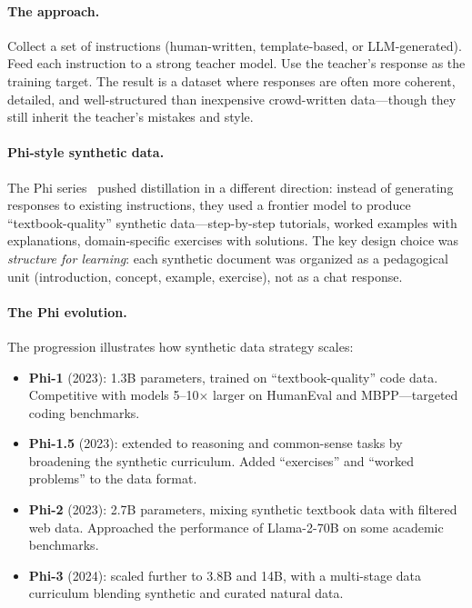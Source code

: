 \paragraph{The approach.} Collect a set of instructions (human-written, template-based, or LLM-generated). Feed each instruction to a strong teacher model. Use the teacher's response as the training target. The result is a dataset where responses are often more coherent, detailed, and well-structured than inexpensive crowd-written data---though they still inherit the teacher's mistakes and style.

\paragraph{Phi-style synthetic data.} The Phi series~\cite{gunasekar2023phi,li2023phi15} pushed distillation in a different direction: instead of generating responses to existing instructions, they used a frontier model to produce ``textbook-quality'' synthetic data---step-by-step tutorials, worked examples with explanations, domain-specific exercises with solutions. The key design choice was \emph{structure for learning}: each synthetic document was organized as a pedagogical unit (introduction, concept, example, exercise), not as a chat response.

\paragraph{The Phi evolution.} The progression illustrates how synthetic data strategy scales:

\begin{itemize}[nosep]
  \item \textbf{Phi-1} (2023): 1.3B parameters, trained on ``textbook-quality'' code data. Competitive with models 5--10$\times$ larger on HumanEval and MBPP---targeted coding benchmarks.
  \item \textbf{Phi-1.5} (2023): extended to reasoning and common-sense tasks by broadening the synthetic curriculum. Added ``exercises'' and ``worked problems'' to the data format.
  \item \textbf{Phi-2} (2023): 2.7B parameters, mixing synthetic textbook data with filtered web data. Approached the performance of Llama-2-70B on some academic benchmarks.
  \item \textbf{Phi-3} (2024): scaled further to 3.8B and 14B, with a multi-stage data curriculum blending synthetic and curated natural data.
\end{itemize}

